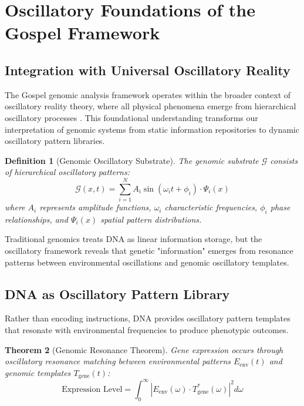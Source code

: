 \documentclass[12pt,a4paper]{article}
\newtheorem{theorem}{Theorem}[section]
\newtheorem{definition}[theorem]{Definition}
\begin{document}
\section{Oscillatory Foundations of the Gospel Framework}

\subsection{Integration with Universal Oscillatory Reality}

The Gospel genomic analysis framework operates within the broader context of oscillatory reality theory, where all physical phenomena emerge from hierarchical oscillatory processes \cite{oscillatory2024mathematical,oscillatory2024cosmic}. This foundational understanding transforms our interpretation of genomic systems from static information repositories to dynamic oscillatory pattern libraries.

\begin{definition}[Genomic Oscillatory Substrate]
The genomic substrate $\mathcal{G}$ consists of hierarchical oscillatory patterns:
$$\mathcal{G}(x,t) = \sum_{i=1}^{N} A_i \sin(\omega_i t + \phi_i) \cdot \Psi_i(x)$$
where $A_i$ represents amplitude functions, $\omega_i$ characteristic frequencies, $\phi_i$ phase relationships, and $\Psi_i(x)$ spatial pattern distributions.
\end{definition}

Traditional genomics treats DNA as linear information storage, but the oscillatory framework reveals that genetic "information" emerges from resonance patterns between environmental oscillations and genomic oscillatory templates.

\subsection{DNA as Oscillatory Pattern Library}

Rather than encoding instructions, DNA provides oscillatory pattern templates that resonate with environmental frequencies to produce phenotypic outcomes.

\begin{theorem}[Genomic Resonance Theorem]
Gene expression occurs through oscillatory resonance matching between environmental patterns $E_{\text{env}}(t)$ and genomic templates $T_{\text{gene}}(t)$:
$$\text{Expression Level} = \int_0^{\infty} |E_{\text{env}}(\omega) \cdot T_{\text{gene}}^*(\omega)|^2 d\omega$$
\end{theorem}
\end{document}
